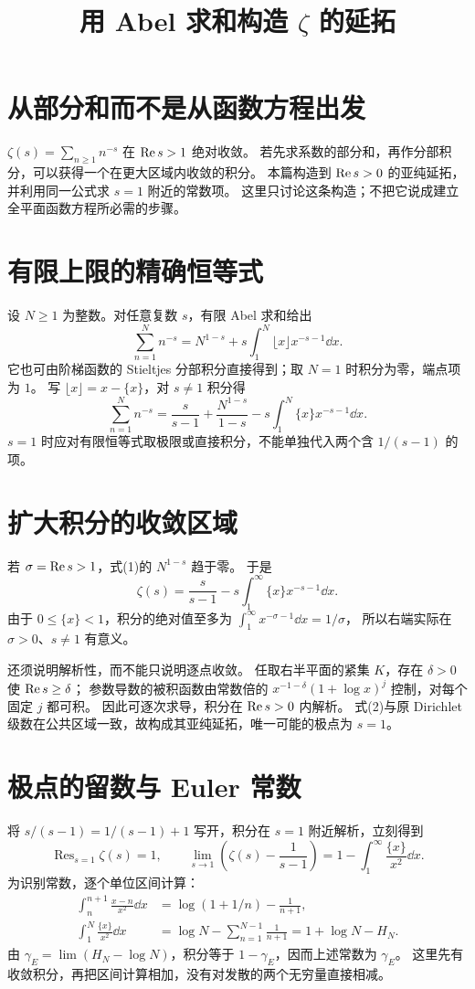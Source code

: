 \documentclass[UTF8,fontset=fandol,11pt]{ctexart}
\title{用 Abel 求和构造 $\zeta$ 的延拓}
\begin{document}
\maketitle
\draftnotice
\section{从部分和而不是从函数方程出发}
$\zeta(s)=\sum_{n\ge1}n^{-s}$ 在 $\operatorname{Re} s>1$ 绝对收敛。
若先求系数的部分和，再作分部积分，可以获得一个在更大区域内收敛的积分。
本篇构造到 $\operatorname{Re} s>0$ 的亚纯延拓，并利用同一公式求 $s=1$ 附近的常数项。
这里只讨论这条构造；不把它说成建立全平面函数方程所必需的步骤。

\section{有限上限的精确恒等式}
设 $N\ge1$ 为整数。对任意复数 $s$，有限 Abel 求和给出
\[
 \sum_{n=1}^Nn^{-s}
 =N^{1-s}+s\int_1^N\lfloor x\rfloor x^{-s-1}\dd x.
\]
它也可由阶梯函数的 Stieltjes 分部积分直接得到；取 $N=1$ 时积分为零，端点项为 $1$。
写 $\lfloor x\rfloor=x-\{x\}$，对 $s\ne1$ 积分得
\[
 \sum_{n=1}^Nn^{-s}
 =\frac{s}{s-1}+\frac{N^{1-s}}{1-s}
  -s\int_1^N\{x\}x^{-s-1}\dd x.                 \tag{1}
\]
$s=1$ 时应对有限恒等式取极限或直接积分，不能单独代入两个含 $1/(s-1)$ 的项。

\section{扩大积分的收敛区域}
若 $\sigma=\operatorname{Re} s>1$，式(1)的 $N^{1-s}$ 趋于零。
于是
\[
 \zeta(s)=\frac{s}{s-1}
 -s\int_1^\infty\{x\}x^{-s-1}\dd x.             \tag{2}
\]
由于 $0\le\{x\}<1$，积分的绝对值至多为
$\int_1^\infty x^{-\sigma-1}\dd x=1/\sigma$，
所以右端实际在 $\sigma>0$、$s\ne1$ 有意义。

还须说明解析性，而不能只说明逐点收敛。
任取右半平面的紧集 $K$，存在 $\delta>0$ 使 $\operatorname{Re} s\ge\delta$；
参数导数的被积函数由常数倍的
$x^{-1-\delta}(1+\log x)^j$ 控制，对每个固定 $j$ 都可积。
因此可逐次求导，积分在 $\operatorname{Re} s>0$ 内解析。
式(2)与原 Dirichlet 级数在公共区域一致，故构成其亚纯延拓，唯一可能的极点为 $s=1$。

\section{极点的留数与 Euler 常数}
将 $s/(s-1)=1/(s-1)+1$ 写开，积分在 $s=1$ 附近解析，立刻得到
\[
 \operatorname{Res}_{s=1}\zeta(s)=1,\qquad
 \lim_{s\to1}\left(\zeta(s)-\frac1{s-1}\right)
 =1-\int_1^\infty\frac{\{x\}}{x^2}\dd x.
\]
为识别常数，逐个单位区间计算：
\begin{align*}
 \int_n^{n+1}\frac{x-n}{x^2}\dd x
 &=\log(1+1/n)-\frac1{n+1},\\
 \int_1^N\frac{\{x\}}{x^2}\dd x
 &=\log N-\sum_{n=1}^{N-1}\frac1{n+1}
 =1+\log N-H_N.
\end{align*}
由 $\gamma_E=\lim(H_N-\log N)$，积分等于 $1-\gamma_E$，因而上述常数为 $\gamma_E$。
这里先有收敛积分，再把区间计算相加，没有对发散的两个无穷量直接相减。
\end{document}
